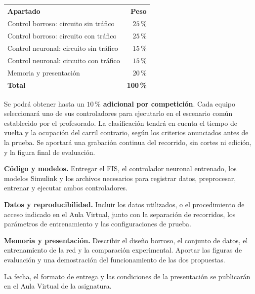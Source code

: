 \documentclass[11pt,a4paper]{article}
\newcommand{\romanitem}[2]{%
  \par\vspace{2mm}%
  \noindent\hangindent=8mm\hangafter=1%
  \makebox[8mm][r]{\textbf{#1.}\hspace{1.5mm}}#2\par
}
\begin{document}
\begin{center}
\begin{tabularx}{0.96\textwidth}{@{}X r@{}}
\toprule
\textbf{Apartado} & \textbf{Peso}\\
\midrule
Control borroso: circuito sin tráfico & $25\,\%$\\
Control borroso: circuito con tráfico & $25\,\%$\\
Control neuronal: circuito sin tráfico & $15\,\%$\\
Control neuronal: circuito con tráfico & $15\,\%$\\
Memoria y presentación & $20\,\%$\\
\midrule
\textbf{Total} & \textbf{100\,\%}\\
\bottomrule
\end{tabularx}
\end{center}

Se podrá obtener hasta un \textbf{$10\,\%$ adicional por competición}.
Cada equipo seleccionará uno de sus controladores para ejecutarlo
en el escenario común establecido por el profesorado.
La clasificación tendrá en cuenta el tiempo de vuelta y la ocupación
del carril contrario, según los criterios anunciados antes de la prueba.
Se aportará una grabación continua del recorrido, sin cortes ni edición,
y la figura final de evaluación.

\romanitem{i}{\textbf{Código y modelos.}
Entregar el FIS, el controlador neuronal entrenado, los modelos Simulink
y los archivos necesarios para registrar datos, preprocesar, entrenar
y ejecutar ambos controladores.}

\romanitem{ii}{\textbf{Datos y reproducibilidad.}
Incluir los datos utilizados, o el procedimiento de acceso indicado
en el Aula Virtual, junto con la separación de recorridos, los parámetros
de entrenamiento y las configuraciones de prueba.}

\romanitem{iii}{\textbf{Memoria y presentación.}
Describir el diseño borroso, el conjunto de datos, el entrenamiento de la red
y la comparación experimental. Aportar las figuras de evaluación
y una demostración del funcionamiento de las dos propuestas.}

La fecha, el formato de entrega y las condiciones de la presentación
se publicarán en el Aula Virtual de la asignatura.
\end{document}
